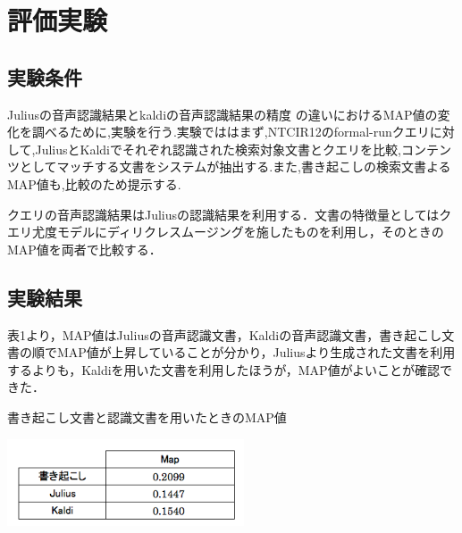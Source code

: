 \section{評価実験}
\subsection{実験条件}

Juliusの音声認識結果とkaldiの音声認識結果の精度
の違いにおけるMAP値の変化を調べるために,実験を行う.実験でははまず,NTCIR12のformal-runクエリに対して,JuliusとKaldiでそれぞれ認識された検索対象文書とクエリを比較,コンテンツとしてマッチする文書をシステムが抽出する.また,書き起こしの検索文書よるMAP値も,比較のため提示する.

クエリの音声認識結果はJuliusの認識結果を利用する．文書の特徴量としてはクエリ尤度モデルにディリクレスムージングを施したものを利用し，そのときのMAP値を両者で比較する．

\subsection{実験結果}

表1より，MAP値はJuliusの音声認識文書，Kaldiの音声認識文書，書き起こし文書の順でMAP値が上昇していることが分かり，Juliusより生成された文書を利用するよりも，Kaldiを用いた文書を利用したほうが，MAP値がよいことが確認できた．

\begin{table}
    \centering
    \caption{書き起こし文書と認識文書を用いたときのMAP値}
    \includegraphics[width=7cm]{./image/write_julius_kaldi.png}
    \label{query_set}
\end{table}

